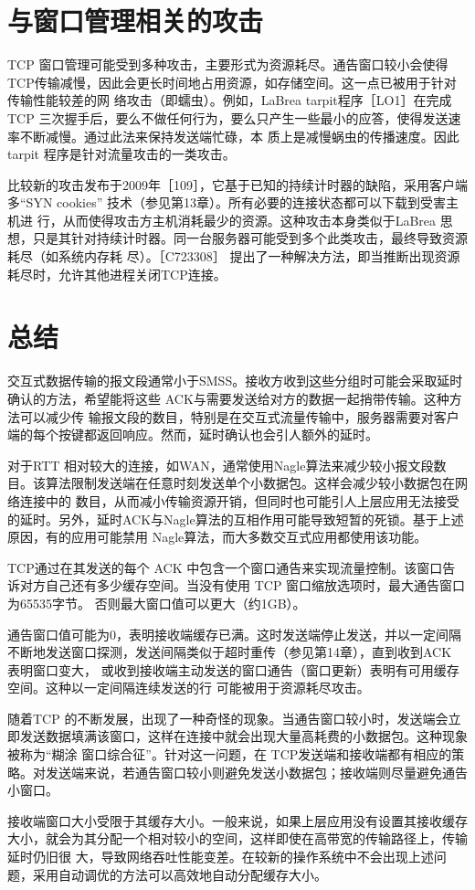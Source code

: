 \section{与窗口管理相关的攻击}
TCP 窗口管理可能受到多种攻击，主要形式为资源耗尽。通告窗口较小会使得TCP传输减慢，因此会更长时间地占用资源，如存储空间。这一点已被用于针对传输性能较差的网
络攻击（即蠕虫）。例如，LaBrea tarpit程序［LO1］在完成 TCP 三次握手后，要么不做任何行为，要么只产生一些最小的应答，使得发送速率不断减慢。通过此法来保持发送端忙碌，本
质上是减慢蜗虫的传播速度。因此 tarpit 程序是针对流量攻击的一类攻击。

比较新的攻击发布于2009年［109］，它基于已知的持续计时器的缺陷，采用客户端多“SYN cookies” 技术（参见第13章）。所有必要的连接状态都可以下载到受害主机进
行，从而使得攻击方主机消耗最少的资源。这种攻击本身类似于LaBrea 思想，只是其针对持续计时器。同一台服务器可能受到多个此类攻击，最终导致资源耗尽（如系统内存耗
尽）。［C723308］ 提出了一种解决方法，即当推断出现资源耗尽时，允许其他进程关闭TCP连接。


\section{总结}

交互式数据传输的报文段通常小于SMSS。接收方收到这些分组时可能会采取延时确认的方法，希望能将这些 ACK与需要发送给对方的数据一起捎带传输。这种方法可以减少传
输报文段的数目，特别是在交互式流量传输中，服务器需要对客户端的每个按键都返回响应。然而，延时确认也会引人额外的延时。

对于RTT 相对较大的连接，如WAN，通常使用Nagle算法来减少较小报文段数目。该算法限制发送端在任意时刻发送单个小数据包。这样会减少较小数据包在网络连接中的
数目，从而减小传输资源开销，但同时也可能引人上层应用无法接受的延时。另外，延时ACK与Nagle算法的互相作用可能导致短暂的死锁。基于上述原因，有的应用可能禁用
Nagle算法，而大多数交互式应用都使用该功能。

TCP通过在其发送的每个 ACK 中包含一个窗口通告来实现流量控制。该窗口告诉对方自己还有多少缓存空间。当没有使用 TCP 窗口缩放选项时，最大通告窗口为65535字节。
否则最大窗口值可以更大（约1GB）。

通告窗口值可能为0，表明接收端缓存已满。这时发送端停止发送，并以一定间隔不断地发送窗口探测，发送间隔类似于超时重传（参见第14章），直到收到ACK 表明窗口变大，
或收到接收端主动发送的窗口通告（窗口更新）表明有可用缓存空间。这种以一定间隔连续发送的行 可能被用于资源耗尽攻击。

随着TCP 的不断发展，出现了一种奇怪的现象。当通告窗口较小时，发送端会立即发送数据填满该窗口，这样在连接中就会出现大量高耗费的小数据包。这种现象被称为“糊涂
窗口综合征”。针对这一问题，在 TCP发送端和接收端都有相应的策略。对发送端来说，若通告窗口较小则避免发送小数据包；接收端则尽量避免通告小窗口。

接收端窗口大小受限于其缓存大小。一般来说，如果上层应用没有设置其接收缓存大小，就会为其分配一个相对较小的空间，这样即使在高带宽的传输路径上，传输延时仍旧很
大，导致网络吞吐性能变差。在较新的操作系统中不会出现上述问题，采用自动调优的方法可以高效地自动分配缓存大小。
